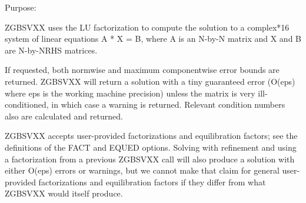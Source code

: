  \begin{DoxyParagraph}{Purpose\+: }
\begin{DoxyVerb}    ZGBSVXX uses the LU factorization to compute the solution to a
    complex*16 system of linear equations  A * X = B,  where A is an
    N-by-N matrix and X and B are N-by-NRHS matrices.

    If requested, both normwise and maximum componentwise error bounds
    are returned. ZGBSVXX will return a solution with a tiny
    guaranteed error (O(eps) where eps is the working machine
    precision) unless the matrix is very ill-conditioned, in which
    case a warning is returned. Relevant condition numbers also are
    calculated and returned.

    ZGBSVXX accepts user-provided factorizations and equilibration
    factors; see the definitions of the FACT and EQUED options.
    Solving with refinement and using a factorization from a previous
    ZGBSVXX call will also produce a solution with either O(eps)
    errors or warnings, but we cannot make that claim for general
    user-provided factorizations and equilibration factors if they
    differ from what ZGBSVXX would itself produce.\end{DoxyVerb}
 
\end{DoxyParagraph}

